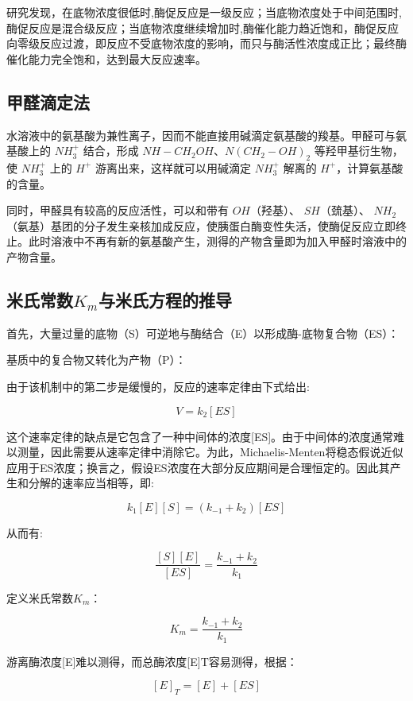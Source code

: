 \documentclass[UTF8]{ctexart}
\begin{document}
	研究发现，在底物浓度很低时,酶促反应是一级反应；当底物浓度处于中间范围时,酶促反应是混合级反应；当底物浓度继续增加时,酶催化能力趋近饱和，酶促反应向零级反应过渡，即反应不受底物浓度的影响，而只与酶活性浓度成正比；最终酶催化能力完全饱和，达到最大反应速率。
	
	\subsection{甲醛滴定法}
水溶液中的氨基酸为兼性离子，因而不能直接用碱滴定氨基酸的羧基。甲醛可与氨基酸上的 \(NH_3^+\) 结合，形成 \(NH-CH_2OH\)、\(N(CH_2-OH)_2\) 等羟甲基衍生物，使 \(NH_3^+\) 上的 \(H^+\) 游离出来，这样就可以用碱滴定 \(NH_3^+\) 解离的 \(H^+\)，计算氨基酸的含量。

同时，甲醛具有较高的反应活性，可以和带有 \(OH\)（羟基）、 \(SH\)（巯基）、 \(NH_2\)（氨基）基团的分子发生亲核加成反应，使胰蛋白酶变性失活，使酶促反应立即终止。此时溶液中不再有新的氨基酸产生，测得的产物含量即为加入甲醛时溶液中的产物含量。
	\subsection{米氏常数$K_m$与米氏方程的推导}
	首先，大量过量的底物（S）可逆地与酶结合（E）以形成酶-底物复合物（ES）：
	\begin{center}
	\end{center}
	
	基质中的复合物又转化为产物（P）：
	\begin{center}
	\end{center}
	
	由于该机制中的第二步是缓慢的，反应的速率定律由下式给出:
	
	\[V = k_2[ES]\]
	
	这个速率定律的缺点是它包含了一种中间体的浓度[ES]。由于中间体的浓度通常难以测量，因此需要从速率定律中消除它。为此，Michaelis-Menten将稳态假说近似应用于ES浓度；换言之，假设ES浓度在大部分反应期间是合理恒定的。因此其产生和分解的速率应当相等，即:
	
	\[k_1[E][S]=(k_{-1}+k_2)[ES]\]
	
	从而有:
	
	\[\frac{[S][E]}{[ES]} = \frac{k_{-1} + k_2}{k_1}\]
	
	定义米氏常数$K_m$：
	
	\[K_m=\frac{k_{-1} + k_2}{k_1}\]
	
	游离酶浓度[E]难以测得，而总酶浓度[E]T容易测得，根据：
	
	\[[E]_T = [E] + [ES]\]
	
\end{document}
